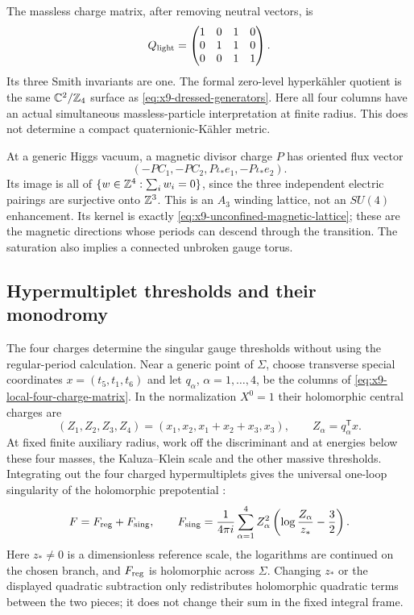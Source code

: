 The massless charge matrix, after removing neutral vectors, is
\begin{equation}
 Q_{\rm light}=\begin{pmatrix}1&0&1&0\\0&1&1&0\\0&0&1&1\end{pmatrix}.
 \label{eq:x9-local-four-charge-matrix}
\end{equation}
Its three Smith invariants are one. The formal zero-level
hyperk\"ahler quotient is the same $\mathbb C^2/\mathbb Z_4$ surface as
\eqref{eq:x9-dressed-generators}. Here all four columns have an actual
simultaneous massless-particle interpretation at finite radius.
This does not determine a compact quaternionic-K\"ahler metric.

At a generic Higgs vacuum, a magnetic divisor charge $P$ has
oriented flux vector
\[
 (-PC_1,-PC_2,P\iota_*e_1,-P\iota_*e_2).
\]
Its image is all of $\{w\in\mathbb Z^4:\sum_iw_i=0\}$, since
the three independent electric pairings are surjective onto
$\mathbb Z^3$. This is an $A_3$ winding lattice, not an $SU(4)$
enhancement. Its kernel is exactly
\eqref{eq:x9-unconfined-magnetic-lattice}; these are the magnetic
directions whose periods can descend through the transition.
The saturation also implies a connected unbroken gauge torus.

\subsection{Hypermultiplet thresholds and their monodromy}
\label{subsec:x9-conifold-thresholds}

The four charges determine the singular gauge thresholds without
using the regular-period calculation. Near a generic point of $\Sigma$,
choose transverse special coordinates $x=(t_5,t_1,t_6)$ and let
$q_\alpha$, $\alpha=1,\ldots,4$, be the columns of
\eqref{eq:x9-local-four-charge-matrix}. In the normalization $X^0=1$
their holomorphic central charges are
\begin{equation}
 (Z_1,Z_2,Z_3,Z_4)
   =(x_1,x_2,x_1+x_2+x_3,x_3),\qquad
 Z_\alpha=q_\alpha^{\mathsf T}x.
 \label{eq:x9-threshold-central-charges}
\end{equation}
At fixed finite auxiliary radius, work off the discriminant and at
energies below these four masses, the Kaluza--Klein scale and the
other massive thresholds. Integrating out the four charged
hypermultiplets gives the universal one-loop singularity of the
holomorphic prepotential \cite[Sections~2 and~4]{Strominger:1995Conifold}:
\begin{equation}
 F=F_{\rm reg}+F_{\rm sing},\qquad
 F_{\rm sing}=\frac1{4\pi i}\sum_{\alpha=1}^4
 Z_\alpha^2\left(\log\frac{Z_\alpha}{z_*}-\frac32\right).
 \label{eq:x9-threshold-prepotential}
\end{equation}
Here $z_*\ne0$ is a dimensionless reference scale, the logarithms
are continued on the chosen branch, and $F_{\rm reg}$ is holomorphic
across $\Sigma$. Changing $z_*$ or the displayed quadratic subtraction
only redistributes holomorphic quadratic terms between the two pieces;
it does not change their sum in the fixed integral frame.

